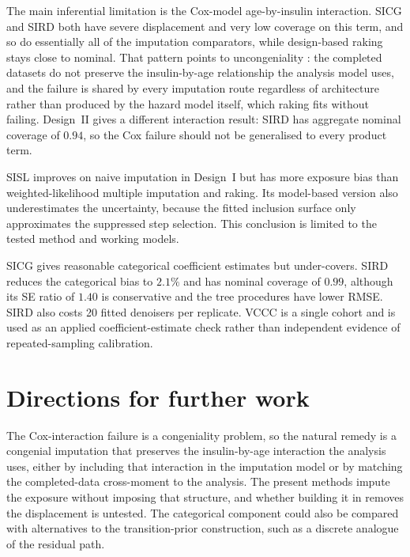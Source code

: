 The main inferential limitation is the Cox-model age-by-insulin interaction. SICG and SIRD both have severe displacement and very low coverage on this term, and so do essentially all of the imputation comparators, while design-based raking stays close to nominal. That pattern points to uncongeniality \citep{meng1994multiple}: the completed datasets do not preserve the insulin-by-age relationship the analysis model uses, and the failure is shared by every imputation route regardless of architecture rather than produced by the hazard model itself, which raking fits without failing. Design~II gives a different interaction result: SIRD has aggregate nominal coverage of $0.94$, so the Cox failure should not be generalised to every product term.

SISL improves on naive imputation in Design~I but has more exposure bias than weighted-likelihood multiple imputation and raking. Its model-based version also underestimates the uncertainty, because the fitted inclusion surface only approximates the suppressed step selection. This conclusion is limited to the tested method and working models.

SICG gives reasonable categorical coefficient estimates but under-covers. SIRD reduces the categorical bias to $2.1\%$ and has nominal coverage of $0.99$, although its SE ratio of $1.40$ is conservative and the tree procedures have lower RMSE. SIRD also costs 20 fitted denoisers per replicate. VCCC is a single cohort and is used as an applied coefficient-estimate check rather than independent evidence of repeated-sampling calibration.

\section{Directions for further work}
\label{sec:conc_future}

The Cox-interaction failure is a congeniality problem, so the natural remedy is a congenial imputation that preserves the insulin-by-age interaction the analysis uses, either by including that interaction in the imputation model or by matching the completed-data cross-moment to the analysis. The present methods impute the exposure without imposing that structure, and whether building it in removes the displacement is untested. The categorical component could also be compared with alternatives to the transition-prior construction, such as a discrete analogue of the residual path.

